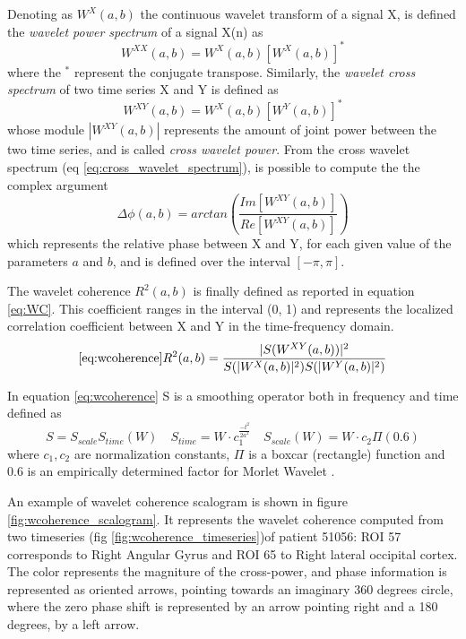\documentclass[11pt]{report}
\begin{document}
Denoting as $W^{X}(a, b)$ the continuous wavelet transform of a signal X, is defined the \emph{wavelet power spectrum} of a signal X(n) as
\begin{equation}
W^{XX}(a, b) = W^X(a, b) \left[W^X(a, b)\right]^{\ast}
\end{equation}
where the $^{\ast}$ represent the conjugate transpose.
Similarly, the \emph{wavelet cross spectrum} of two time series X and Y is defined as
\begin{equation}\label{eq:cross_wavelet_spectrum}
W^{XY}(a, b) = W^X(a, b)[W^Y(a, b)]^\ast
\end{equation}
whose module $|W^{XY}(a, b)|$ represents the amount of joint power between the two time series, and is called \emph{cross wavelet power}.
From the cross wavelet spectrum (eq \ref{eq:cross_wavelet_spectrum}), is possible to compute the the complex argument
\begin{equation}\label{eq:wavelet_phase}
\Delta \phi (a, b) = arctan\left(\frac{Im\left[ W^{XY}(a, b)\right]}{Re\left[ W^{XY}(a, b)\right]} \right)
\end{equation}
which represents the relative phase between X and Y, for each given value of the parameters $a$ and $b$, and is defined over the interval $[-\pi, \pi]$.

The wavelet coherence $R^2(a, b)$ is finally defined as reported in equation \ref{eq:WC}. This coefficient ranges in the interval (0, 1) and represents the localized correlation coefficient between X and Y in the time-frequency domain.
\begin{equation}\ref{eq:wcoherence}
R^2(a, b) = \frac{|S(W^{XY}(a,b))|^2}{S(|W^X(a,b)|^2) S(|W^Y(a,b)|^2)}
\label{eq:WC}
\end{equation}

In equation \ref{eq:wcoherence} S is a smoothing operator both in frequency and time defined as \cite{torrence-1999} \cite{grinsted-2004}
\[
S = S_{scale}S_{time}(W) \quad S_{time} = W\cdot c_1 ^{\frac{-t^2}{2a^2}} \quad S_{scale}(W) = W\cdot c_2 \Pi(0.6)
\]
where $c_1, c_2$ are normalization constants, $\Pi$ is a boxcar (rectangle) function and 0.6 is an empirically determined factor for Morlet Wavelet \cite{torrence-1998}.

An example of wavelet coherence scalogram is shown in figure \ref{fig:wcoherence_scalogram}. It represents the wavelet coherence computed from two timeseries (fig \ref{fig:wcoherence_timeseries})of patient 51056: ROI 57 corresponds to Right Angular Gyrus and ROI 65 to Right lateral occipital cortex.
The color represents the magniture of the cross-power, and phase information is represented as oriented arrows, pointing towards an imaginary 360 degrees circle, where the zero phase shift is represented by an arrow pointing right and a 180 degrees, by a left arrow.
\end{document}

